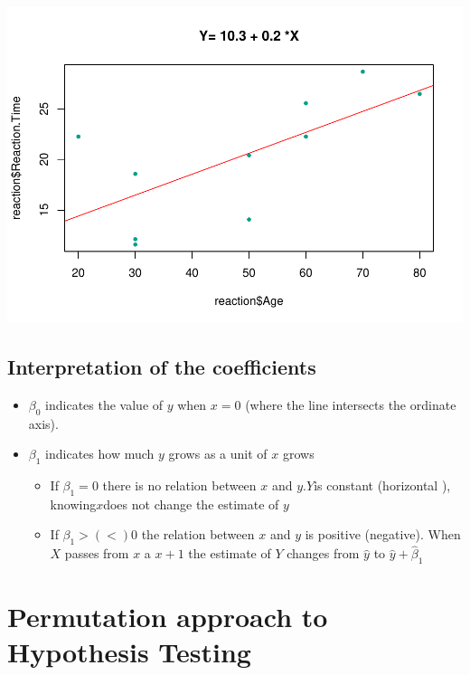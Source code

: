 \documentclass[]{article}
\providecommand{\tightlist}{%
  \setlength{\itemsep}{0pt}\setlength{\parskip}{0pt}}
\begin{document}
\begin{center}\includegraphics{inference_booklet_files/figure-latex/unnamed-chunk-6-1} \end{center}

\hypertarget{interpretation-of-the-coefficients}{%
\subsection{Interpretation of the
coefficients}\label{interpretation-of-the-coefficients}}

\begin{itemize}
\tightlist
\item
  \(\beta_0\) indicates the value of \(y\) when \(x=0\) (where the line
  intersects the ordinate axis).
\item
  \(\beta_1\) indicates how much \(y\) grows as a unit of \(x\) grows

  \begin{itemize}
  \tightlist
  \item
    If \(\beta_1=0\) there is no relation between \(x\) and
    \(y\).\(Y\)is constant (horizontal ), knowing\(x\)does not change
    the estimate of \(y\)
  \item
    If \(\beta_1> (<) 0\) the relation between \(x\) and \(y\) is
    positive (negative). When \(X\) passes from \(x\) a \(x + 1\) the
    estimate of \(Y\) changes from \(\hat{y}\) to
    \(\hat{y} + \hat{\beta}_1\)
  \end{itemize}
\end{itemize}

\hypertarget{permutation-approach-to-hypothesis-testing}{%
\section{Permutation approach to Hypothesis
Testing}\label{permutation-approach-to-hypothesis-testing}}
\end{document}
